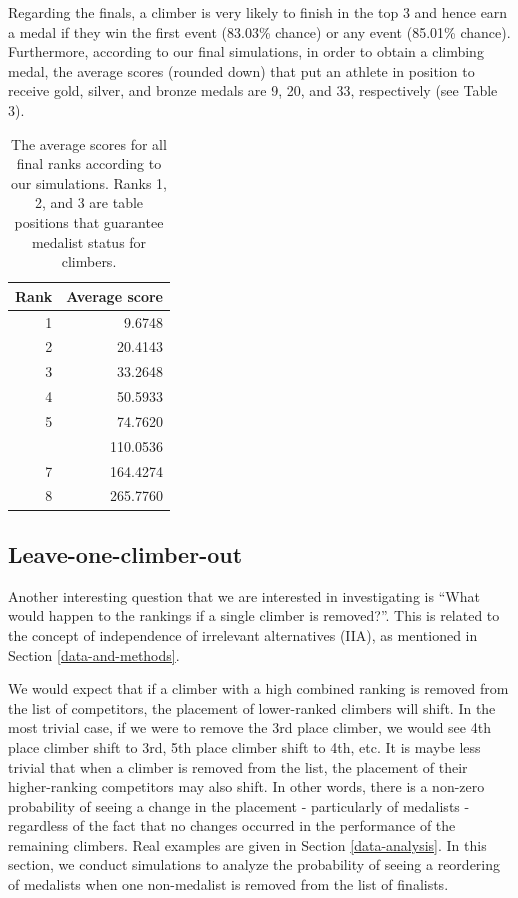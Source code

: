\documentclass[12pt]{article}
\begin{document}
Regarding the finals, a climber is very likely to finish in the top 3
and hence earn a medal if they win the first event (83.03\% chance) or
any event (85.01\% chance). Furthermore, according to our final
simulations, in order to obtain a climbing medal, the average scores
(rounded down) that put an athlete in position to receive gold, silver,
and bronze medals are 9, 20, and 33, respectively (see Table 3).

\begin{table}[H]

\caption{\label{tab:unnamed-chunk-7}The average scores for all final ranks according to our simulations. Ranks 1, 2, and 3 are table positions that guarantee medalist status for climbers.}
\centering
\begin{tabular}[t]{rr}
\toprule
Rank & Average score\\
\midrule
1 & 9.6748\\
2 & 20.4143\\
3 & 33.2648\\
4 & 50.5933\\
5 & 74.7620\\
\addlinespace
6 & 110.0536\\
7 & 164.4274\\
8 & 265.7760\\
\bottomrule
\end{tabular}
\end{table}

\hypertarget{leave-one-climber-out}{%
\subsection{Leave-one-climber-out}\label{leave-one-climber-out}}

Another interesting question that we are interested in investigating is
``What would happen to the rankings if a single climber is removed?''.
This is related to the concept of independence of irrelevant
alternatives (IIA), as mentioned in Section \ref{data-and-methods}.

We would expect that if a climber with a high combined ranking is
removed from the list of competitors, the placement of lower-ranked
climbers will shift. In the most trivial case, if we were to remove the
3rd place climber, we would see 4th place climber shift to 3rd, 5th
place climber shift to 4th, etc. It is maybe less trivial that when a
climber is removed from the list, the placement of their higher-ranking
competitors may also shift. In other words, there is a non-zero
probability of seeing a change in the placement - particularly of
medalists - regardless of the fact that no changes occurred in the
performance of the remaining climbers. Real examples are given in
Section \ref{data-analysis}. In this section, we conduct simulations to
analyze the probability of seeing a reordering of medalists when one
non-medalist is removed from the list of finalists.
\end{document}
